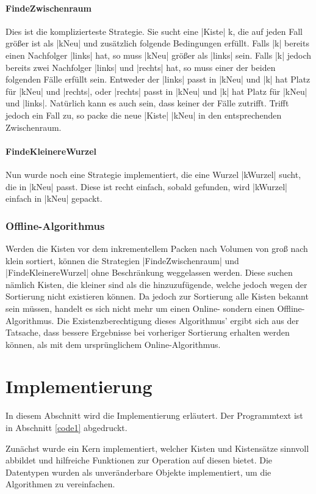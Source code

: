 \paragraph{FindeZwischenraum}
 Dies ist die komplizierteste Strategie. Sie sucht eine |Kiste| k, die auf jeden Fall größer ist als |kNeu| und zusätzlich folgende Bedingungen erfüllt.
 Falls |k| bereits einen Nachfolger |links| hat, so muss |kNeu| größer als |links| sein.
 Falls |k| jedoch bereits zwei Nachfolger |links| und |rechts| hat, so muss einer der beiden folgenden Fälle erfüllt sein.
  Entweder der |links|  passt in |kNeu| und |k| hat Platz für |kNeu| und |rechts|,
          oder |rechts| passt in |kNeu| und |k| hat Platz für |kNeu| und |links|.
 Natürlich kann es auch sein, dass keiner der Fälle zutrifft. Trifft jedoch ein Fall zu, so packe die neue |Kiste| |kNeu| in den entsprechenden Zwischenraum.
\paragraph{FindeKleinereWurzel}
 Nun wurde noch eine Strategie implementiert, die eine Wurzel |kWurzel| sucht, die in |kNeu| passt.
 Diese ist recht einfach, sobald gefunden, wird |kWurzel| einfach in |kNeu| gepackt.
\subsubsection{Offline-Algorithmus}
 Werden die Kisten vor dem inkrementellem Packen nach Volumen von groß nach klein sortiert,
  können die Strategien |FindeZwischenraum| und |FindeKleinereWurzel| ohne Beschränkung weggelassen werden.
 Diese suchen nämlich Kisten, die kleiner sind als die hinzuzufügende, welche jedoch wegen der Sortierung nicht existieren können.
 Da jedoch zur Sortierung alle Kisten bekannt sein müssen, handelt es sich nicht mehr um einen Online- sondern einen Offline-Algorithmus.
 Die Existenzberechtigung dieses Algorithmus' ergibt sich aus der Tatsache, dass bessere Ergebnisse bei vorheriger Sortierung erhalten werden können,
  als mit dem ursprünglichem Online-Algorithmus.
\clearpage

\section{Implementierung}
\lstset{basicstyle=\ttfamily}
 In diesem Abschnitt wird die Implementierung erläutert. Der Programmtext ist in Abschnitt \ref{code1} abgedruckt.

 Zunächst wurde ein Kern implementiert, welcher Kisten und Kistensätze sinnvoll abbildet und hilfreiche Funktionen zur Operation auf diesen bietet.
 Die Datentypen wurden als unveränderbare Objekte implementiert, um die Algorithmen zu vereinfachen.
